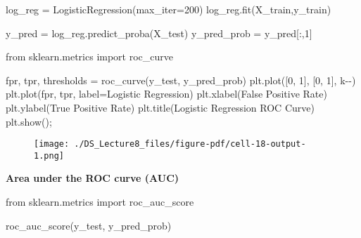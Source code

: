 \documentclass[
  letterpaper,
  DIV=11,
  numbers=noendperiod]{scrreprt}
\newenvironment{Shaded}{\begin{snugshade}}{\end{snugshade}}
\newcommand{\DecValTok}[1]{\textcolor[rgb]{0.68,0.00,0.00}{#1}}
\newcommand{\ImportTok}[1]{\textcolor[rgb]{0.00,0.46,0.62}{#1}}
\newcommand{\NormalTok}[1]{\textcolor[rgb]{0.00,0.23,0.31}{#1}}
\newcommand{\OperatorTok}[1]{\textcolor[rgb]{0.37,0.37,0.37}{#1}}
\newcommand{\StringTok}[1]{\textcolor[rgb]{0.13,0.47,0.30}{#1}}
\begin{document}
\begin{Shaded}
\begin{Highlighting}[]
\NormalTok{log\_reg }\OperatorTok{=}\NormalTok{ LogisticRegression(max\_iter}\OperatorTok{=}\DecValTok{200}\NormalTok{)}
\NormalTok{log\_reg.fit(X\_train,y\_train)}

\NormalTok{y\_pred }\OperatorTok{=}\NormalTok{ log\_reg.predict\_proba(X\_test) }
\NormalTok{y\_pred\_prob }\OperatorTok{=}\NormalTok{ y\_pred[:,}\DecValTok{1}\NormalTok{]}
\end{Highlighting}
\end{Shaded}

\begin{Shaded}
\begin{Highlighting}[]
\ImportTok{from}\NormalTok{ sklearn.metrics }\ImportTok{import}\NormalTok{ roc\_curve}

\NormalTok{fpr, tpr, thresholds }\OperatorTok{=}\NormalTok{ roc\_curve(y\_test, y\_pred\_prob)}
\NormalTok{plt.plot([}\DecValTok{0}\NormalTok{, }\DecValTok{1}\NormalTok{], [}\DecValTok{0}\NormalTok{, }\DecValTok{1}\NormalTok{], }\StringTok{\textquotesingle{}k{-}{-}\textquotesingle{}}\NormalTok{)}
\NormalTok{plt.plot(fpr, tpr, label}\OperatorTok{=}\StringTok{\textquotesingle{}Logistic Regression\textquotesingle{}}\NormalTok{)}
\NormalTok{plt.xlabel(}\StringTok{\textquotesingle{}False Positive Rate\textquotesingle{}}\NormalTok{)}
\NormalTok{plt.ylabel(}\StringTok{\textquotesingle{}True Positive Rate\textquotesingle{}}\NormalTok{)}
\NormalTok{plt.title(}\StringTok{\textquotesingle{}Logistic Regression ROC Curve\textquotesingle{}}\NormalTok{)}
\NormalTok{plt.show()}\OperatorTok{;}
\end{Highlighting}
\end{Shaded}

\begin{figure}[H]

{\centering \texttt{[image: ./DS\_Lecture8\_files/figure-pdf/cell-18-output-1.png]}

}

\end{figure}

\textbf{Area under the ROC curve (AUC)}

\begin{Shaded}
\begin{Highlighting}[]
\ImportTok{from}\NormalTok{ sklearn.metrics }\ImportTok{import}\NormalTok{ roc\_auc\_score}

\NormalTok{roc\_auc\_score(y\_test, y\_pred\_prob)}
\end{Highlighting}
\end{Shaded}
\end{document}
